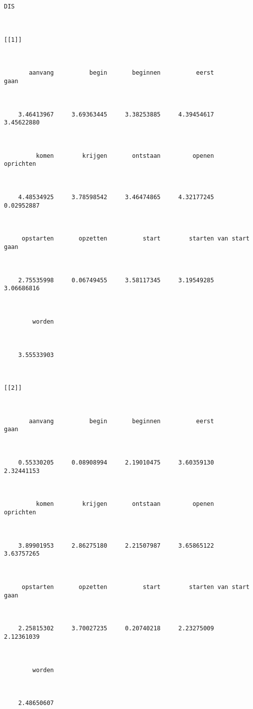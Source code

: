 \begin{lstlisting}
DIS



[[1]]



       aanvang          begin       beginnen          eerst           gaan 



    3.46413967     3.69363445     3.38253885     4.39454617     3.45622880 



         komen        krijgen       ontstaan         openen      oprichten 



    4.48534925     3.78598542     3.46474865     4.32177245     0.02952887 



     opstarten       opzetten          start        starten van start gaan 



    2.75535998     0.06749455     3.58117345     3.19549285     3.06686816 



        worden 



    3.55533903 



[[2]]



       aanvang          begin       beginnen          eerst           gaan 



    0.55330205     0.08908994     2.19010475     3.60359130     2.32441153 



         komen        krijgen       ontstaan         openen      oprichten 



    3.89901953     2.86275180     2.21507987     3.65865122     3.63757265 



     opstarten       opzetten          start        starten van start gaan 



    2.25815302     3.70027235     0.20740218     2.23275009     2.12361039 



        worden 



    2.48650607 




\end{lstlisting}
